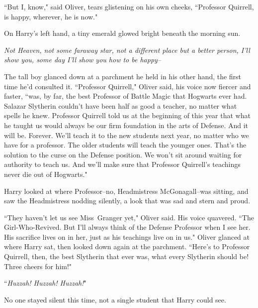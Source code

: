 ``But I, know," said Oliver, tears glistening on his own cheeks, ``Professor Quirrell, is happy, wherever, he is now."

On Harry's left hand, a tiny emerald glowed bright beneath the morning sun.

\emph{Not Heaven, not some faraway star, not a different place but a better person, I'll show you, some day I'll show you how to be happy\---}

The tall boy glanced down at a parchment he held in his other hand, the first time he'd consulted it. ``Professor Quirrell," Oliver said, his voice now fiercer and faster, ``was, by far, the best Professor of Battle Magic that Hogwarts ever had. Salazar Slytherin couldn't have been half as good a teacher, no matter what spells he knew. Professor Quirrell told us at the beginning of this year that what he taught us would always be our firm foundation in the arts of Defense. And it will be. Forever. We'll teach it to the new students next year, no matter who we have for a professor. The older students will teach the younger ones. That's the solution to the curse on the Defense position. We won't sit around waiting for authority to teach us. And we'll make sure that Professor Quirrell's teachings never die out of Hogwarts."

Harry looked at where Professor\---no, Headmistress McGonagall\---was sitting, and saw the Headmistress nodding silently, a look that was sad and stern and proud.

``They haven't let us see Miss~Granger yet," Oliver said. His voice quavered. ``The Girl-Who-Revived. But I'll always think of the Defense Professor when I see her. His sacrifice lives on in her, just as his teachings live on in us." Oliver glanced at where Harry sat, then looked down again at the parchment. ``Here's to Professor Quirrell, then, the best Slytherin that ever was, what every Slytherin should be! Three cheers for him!"

``\emph{Huzzah! Huzzah! Huzzah!}"

No one stayed silent this time, not a single student that Harry could see.

